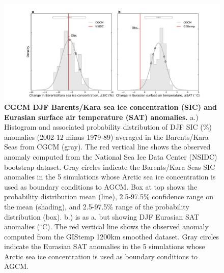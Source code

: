 \documentclass{nature}
\begin{document}
\begin{figure}%
\centering
\noindent\includegraphics[width=39pc]{Word/Figure_2.pdf}
\caption{\textbf{CGCM DJF Barents/Kara sea ice concentration (SIC) and Eurasian surface air temperature (SAT) anomalies.} a.) Histogram and associated probability distribution of DJF SIC (\%) anomalies (2002-12 minus 1979-89) averaged in the Barents/Kara Seas from CGCM (gray). The red vertical line shows the observed anomaly computed from the National Sea Ice Data Center (NSIDC) bootstrap dataset. Gray circles indicate the Barents/Kara Seas SIC anomalies in the 5 simulations whose Arctic sea ice concentration is used as boundary conditions to AGCM. Box at top shows the probability distribution mean (line), 2.5-97.5\% confidence range on the mean (shading), and 2.5-97.5\% range of the probability distribution (box). b.) is as a. but showing DJF Eurasian SAT anomalies ($^\circ$C). The red vertical line shows the observed anomaly computed from the GIStemp 1200km smoothed dataset. Gray circles indicate the Eurasian SAT anomalies in the 5 simulations whose Arctic sea ice concentration is used as boundary conditions to AGCM. 
} %
\label{fig:fig2} 
\end{figure}
\end{document}
